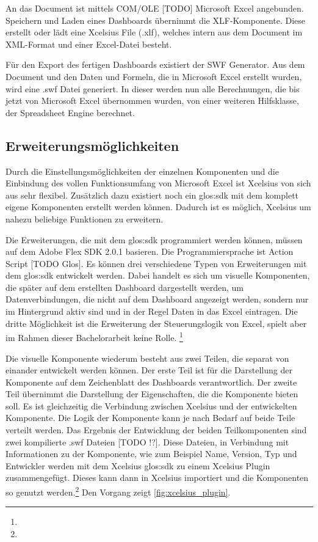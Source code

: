 \begin{onehalfspacing}
An das Document ist mittels COM/OLE [TODO] Microsoft Excel angebunden. Speichern und Laden eines Dashboards übernimmt die XLF-Komponente. Diese erstellt oder lädt eine Xcelsius File (.xlf), welches intern aus dem Document im \gls{XML}-Format und einer Excel-Datei besteht.

Für den Export des fertigen Dashboards existiert der SWF Generator. Aus dem Document und den Daten und Formeln, die in Microsoft Excel erstellt wurden, wird eine .swf Datei generiert. In dieser werden nun alle Berechnungen, die bis jetzt von Microsoft Excel übernommen wurden, von einer weiteren Hilfsklasse, der Spreadsheet Engine berechnet.


\subsection{Erweiterungsmöglichkeiten}

Durch die Einstellungsmöglichkeiten der einzelnen Komponenten und die Einbindung des vollen Funktionsumfang von Microsoft Excel ist Xcelsius von sich aus sehr flexibel. Zusätzlich dazu existiert noch ein \gls{glos:sdk} mit dem komplett eigene Komponenten erstellt werden können. Dadurch ist es möglich, Xcelsius um nahezu beliebige Funktionen zu erweitern.

Die Erweiterungen, die mit dem \gls{glos:sdk} programmiert werden können, müssen auf dem Adobe Flex SDK 2.0.1 basieren. Die Programmiersprache ist Action Script [TODO Glos]. Es können drei verschiedene Typen von Erweiterungen mit dem \gls{glos:sdk} entwickelt werden. Dabei handelt es sich um visuelle Komponenten, die später auf dem erstellten Dashboard dargestellt werden, um Datenverbindungen, die nicht auf dem Dashboard angezeigt werden, sondern nur im Hintergrund aktiv sind und in der Regel Daten in das Excel eintragen. Die dritte Möglichkeit ist die Erweiterung der Steuerungslogik von Excel, spielt aber im Rahmen dieser Bachelorarbeit keine Rolle. \footnote{ }

Die visuelle Komponente wiederum besteht aus zwei Teilen, die separat von einander entwickelt werden können. Der erste Teil ist für die Darstellung der Komponente auf dem Zeichenblatt des Dashboards verantwortlich. Der zweite Teil übernimmt die Darstellung der Eigenschaften, die die Komponente bieten soll. Es ist gleichzeitig die Verbindung zwischen Xcelsius und der entwickelten Komponente. Die Logik der Komponente kann je nach Bedarf auf beide Teile verteilt werden. Das Ergebnis der Entwicklung der beiden Teilkomponenten sind zwei kompilierte .swf Dateien [TODO !?]. Diese Dateien, in Verbindung mit Informationen zu der Komponente, wie zum Beispiel Name, Version, Typ und Entwickler werden mit dem Xcelsius \gls{glos:sdk} zu einem Xcelsius Plugin zusammengefügt. Dieses kann dann in Xcelsius importiert und die Komponenten so genutzt werden.\footnote{ } Den Vorgang zeigt \vref{fig:xcelsius_plugin}.


\end{onehalfspacing}
